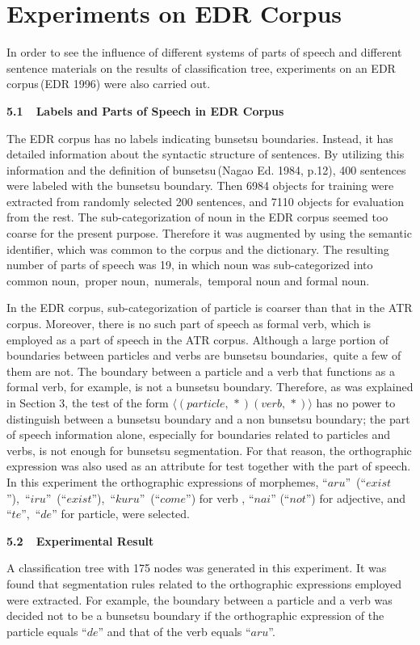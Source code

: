 \section{Experiments on  EDR Corpus}
In order to see the influence of
different systems of parts of speech and
different sentence materials on the results of classification tree,
experiments on an EDR corpus\,(EDR 1996) were also carried out.
\begin{flushleft}
{\large \bf 5.1\ \  Labels and Parts of Speech in EDR  Corpus}
\end{flushleft}
The EDR corpus has  no labels indicating bunsetsu
boundaries. Instead, it has detailed information about the
syntactic structure of sentences.
 By utilizing this information and the definition of
bunsetsu\,(Nagao Ed. 1984, p.12), 400 sentences were labeled with the bunsetsu
boundary. Then
6984 objects for training were extracted from 
randomly selected 200 sentences, and
7110 objects for evaluation from the rest.
The sub-categorization of noun
in the EDR corpus seemed too coarse for the present
purpose. Therefore it was augmented by using the semantic identifier,
which was common to the corpus and the dictionary. The resulting
number of parts of speech was 19, in which noun was sub-categorized
into common noun,\ proper noun,\ numerals,\ temporal noun
and formal noun.

In the EDR corpus, sub-categorization of particle is coarser than that
in the ATR corpus. Moreover, there is no such part of speech  as
formal  verb, 
which is employed as a part of speech  in the ATR corpus. 
Although a large portion  of boundaries between particles  and verbs  are
bunsetsu boundaries,\ quite a few  of them  are not. The  boundary 
between a particle and a verb that functions as a formal  verb,
for example, is not a bunsetsu boundary.
 Therefore, as  was explained in Section 3, 
the test of the form $\langle (particle,\, \ast )(verb,\, \ast)
\rangle $
has no power to distinguish between a bunsetsu boundary and
a non bunsetsu boundary;
the part of speech
information alone, especially for boundaries related to particles and verbs, is  not enough
for bunsetsu segmentation. For that reason, the orthographic
expression
was also used as an attribute for test
together with the part of speech. 
In this experiment the orthographic expressions of  
morphemes, ``$aru$''\ (``$exist$''),\ ``$iru$''\ (``$exist$''),\
``$kuru$''\ (``$come$'') for verb ,  ``$nai$'' (``$not$'')  for adjective,
and ``$te$'',\ ``$de$'' for particle, were selected.
\begin{flushleft}
{\large \bf 5.2\ \ Experimental  Result}
\end{flushleft}
A classification tree with 175 nodes was generated in this experiment.
It was found that segmentation rules related   to the 
orthographic  expressions  employed were extracted.
For example, the boundary between a particle and a verb 
was decided not to be a bunsetsu boundary if the orthographic
expression of the particle equals ``$de$'' and that of the verb 
equals ``$aru$''.

